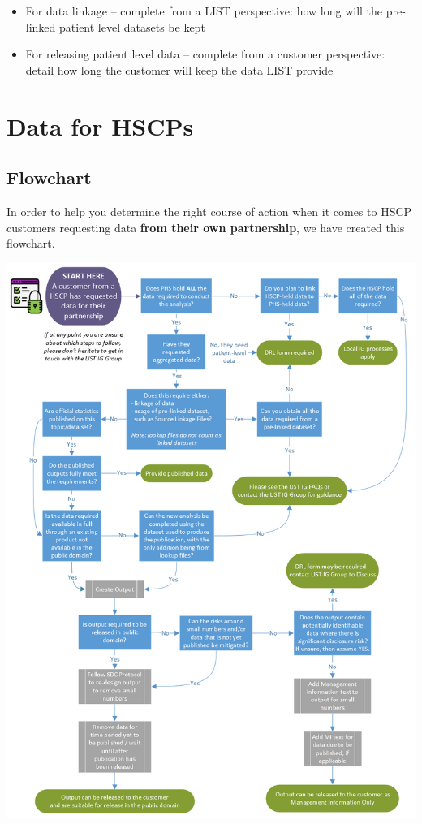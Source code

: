 \documentclass[
]{book}
\begin{document}
\begin{itemize}
\item
  For data linkage -- complete from a LIST perspective: how long will the pre-linked patient level datasets be kept
\item
  For releasing patient level data -- complete from a customer perspective: detail how long the customer will keep the data LIST provide
\end{itemize}

\hypertarget{data-for-hscps}{%
\chapter{Data for HSCPs}\label{data-for-hscps}}

\hypertarget{flowchart}{%
\section{Flowchart}\label{flowchart}}

In order to help you determine the right course of action when it comes to HSCP customers requesting data \textbf{from their own partnership}, we have created this flowchart.

\includegraphics[width=1\linewidth]{imgs/hscp-flowchart}
\end{document}
